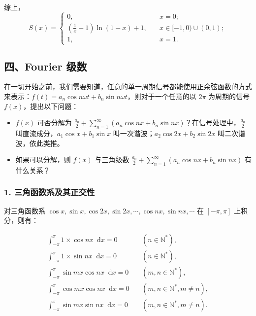 \documentclass[b5paper]{ctexart}
\renewcommand{\d}{\mathop{}\!\mathrm{d}}
\newcommand{\N}{\mathbb{N}}
\newcommand{\jst}{\sum \limits_{n = 1}^{\infty}}
\begin{document}
	\vspace{12pt}
	
	综上，$$ S(x)=\left\{
	\begin{aligned}
		0, \quad &x = 0; \\
		(\frac{1}{x} - 1) \ln(1 - x) + 1, \quad &x \in [-1, 0) \cup (0, 1); \\
		1, \quad &x = 1.
	\end{aligned}
	\right.
	$$
	
	\subsection*{四、Fourier 级数}
	
	在一切开始之前，我们需要知道，任意的单一周期信号都能使用正余弦函数的方式来表示：$f(t) = a_n \cos n \omega t + b_n \sin n \omega t$，则对于一个任意的以 $2\pi$ 为周期的信号 $f(x)$，提出以下问题：
	
	\begin{itemize}
		\item $f(x)$ 可否分解为 $\frac{a_0}{2} + \jst (a_n \cos nx + b_n \sin nx)$？在信号处理中，$\frac{a_0}{2}$ 叫直流成分，$a_1 \cos x + b_1 \sin x$ 叫一次谐波；$a_2 \cos 2x + b_2 \sin 2x$ 叫二次谐波，依此类推。
		
		\item 如果可以分解，则 $f(x)$ 与三角级数 $\frac{a_0}{2} + \jst (a_n \cos nx + b_n \sin nx)$ 有什么关系？
	\end{itemize}
	
	\subsubsection*{1. 三角函数系及其正交性}
	
		对三角函数系 $\cos x, \sin x, \cos 2x, \sin 2x, \cdots, \cos nx, \sin nx, \cdots$ 在 $[-\pi, \pi]$ 上积分，则有：
		
		\begin{equation*}
			\begin{split}
				\int_{-\pi}^{\pi} 1 \times \cos nx \d x = 0 & \quad (n \in \N^*),  \\ 
				\int_{-\pi}^{\pi} 1 \times \sin nx \d x = 0 & \quad (n \in \N^*), \\
				\int_{-\pi}^{\pi} \sin mx \cos nx \d x = 0 & \quad (m, n \in \N^*), \\
				\int_{-\pi}^{\pi} \cos mx \cos nx \d x = 0 & \quad (m, n \in \N^*, m \ne n), \\
				\int_{-\pi}^{\pi} \sin mx \sin nx \d x = 0 & \quad (m, n \in \N^*, m \ne n).
			\end{split}
		\end{equation*}
		
\end{document}
